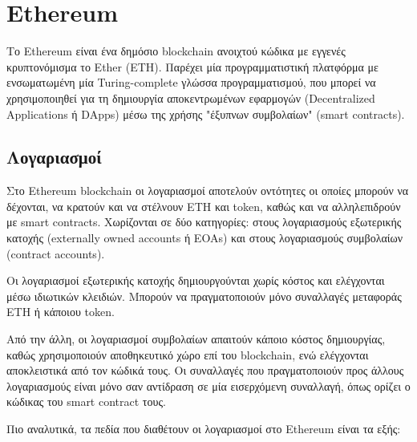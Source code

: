 \section{Ethereum} \label{section:2-6-ethereum}


Το Ethereum είναι ένα δημόσιο blockchain ανοιχτού κώδικα με εγγενές κρυπτονόμισμα το Ether (ETH). Παρέχει μία προγραμματιστική πλατφόρμα με ενσωματωμένη μία Turing-complete γλώσσα προγραμματισμού, που μπορεί να χρησιμοποιηθεί για τη δημιουργία αποκεντρωμένων εφαρμογών (Decentralized Applications ή DApps) μέσω της χρήσης "έξυπνων συμβολαίων" (smart contracts).\cite{2.6-ethereum-whitepaper}

\subsection{Λογαριασμοί} \label{subsection:2-6-1-ethereum-accounts}
Στο Ethereum blockchain οι λογαριασμοί αποτελούν οντότητες οι οποίες μπορούν να δέχονται, να κρατούν και να στέλνουν ETH και token, καθώς και να αλληλεπιδρούν με smart contracts. Χωρίζονται σε δύο κατηγορίες: στους λογαριασμούς εξωτερικής κατοχής (\textenglish{externally owned accounts} ή EOAs) και στους λογαριασμούς συμβολαίων (contract accounts).\cite{2.6-ethereum-documentation}

Οι λογαριασμοί εξωτερικής κατοχής δημιουργούνται χωρίς κόστος και ελέγχονται μέσω ιδιωτικών κλειδιών. Μπορούν να πραγματοποιούν μόνο συναλλαγές μεταφοράς ETH ή κάποιου token.

Από την άλλη, οι λογαριασμοί συμβολαίων απαιτούν κάποιο κόστος δημιουργίας, καθώς χρησιμοποιούν αποθηκευτικό χώρο επί του blockchain, ενώ ελέγχονται αποκλειστικά από τον κώδικά τους. Οι συναλλαγές που πραγματοποιούν προς άλλους λογαριασμούς είναι μόνο σαν αντίδραση σε μία εισερχόμενη συναλλαγή, όπως ορίζει ο κώδικας του smart contract τους.

Πιο αναλυτικά, τα πεδία που διαθέτουν οι λογαριασμοί στο Ethereum είναι τα εξής:

